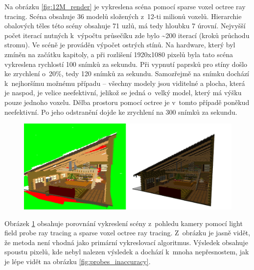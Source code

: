 Na obrázku \ref{fig:12M_render} je vykreslena scéna pomocí sparse voxel octree ray tracing. Scéna obsahuje 36 modelů složených z~12-ti milionů voxelů. Hierarchie obalových těles této scény obsahuje 71 uzlů, má tedy hloubku 7 úrovní. Nejvyšší počet iterací nutných k~výpočtu průsečíku zde bylo \textasciitilde{}200 iterací (kroků průchodu stromu). Ve scéně je prováděn výpočet ostrých stínů. Na hardware, který byl zmíněn na začátku kapitoly, a při rozlišení 1920x1080 pixelů byla tato scéna vykreslena rychlostí 100 snímků za sekundu. Při vypnutí paprsků pro stíny došlo ke zrychlení o~20\%, tedy 120 snímků za sekundu. Samozřejmě na snímku dochází k~nejhoršímu možnému případu -- všechny modely jsou viditelné a plocha, která je naspod, je velice neefektivní, jelikož se jedná o~velký model, který má výšku pouze jednoho voxelu. Dělba prostoru pomocí octree je v~tomto případě poněkud neefektivní.  Po jeho odstranění dojde ke zrychlení na 300 snímků za sekundu. 

\begin{figure}[H]
	\centering
	\captionsetup{justification=centering}
	\includegraphics[scale=1]{images/render_probe_vs_svo.png}
	\label{fig:probe_vs_svo_render}
\end{figure}

Obrázek \ref{fig:probe_vs_svo_render} obsahuje porovnání vykreslení scény z~pohledu kamery pomocí light field probe ray tracing a sparse voxel octree ray tracing. Z~obrázku je jasně vidět, že metoda není vhodná jako primární vykreslovací algoritmus. Výsledek obsahuje spoustu pixelů, kde nebyl nalezen výsledek a dochází k~mnoha nepřesnostem, jak je lépe vidět na obrázku \ref{fig:probes_inaccuracy}.

